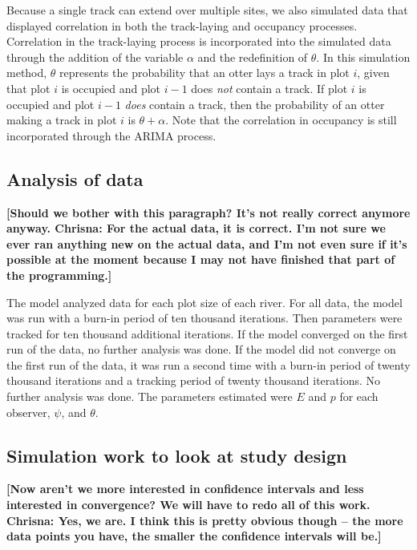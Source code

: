 \documentclass[11pt]{article}
\begin{document}
    Because a single track can extend over multiple sites, we also simulated
    data that displayed correlation in both the track-laying and occupancy
    processes.  Correlation in the track-laying process is incorporated into
    the simulated data through the addition of the variable \(\alpha\) and the
    redefinition of \(\theta\).  In this simulation method, \(\theta\)
    represents the probability that an otter lays a track in plot \(i\), given
    that plot \(i\) is occupied and plot \(i-1\) does \textit{not} contain a
    track. If plot \(i\) is occupied and plot \(i-1\) \textit{does} contain a
    track, then the probability of an otter making a track in plot \(i\) is
    \(\theta+\alpha\). Note that the correlation in occupancy is still
    incorporated through the ARIMA process.

    \subsection{Analysis of data}

    \textbf{[Should we bother with this paragraph? It's not really correct
    anymore anyway.  Chrisna: For the actual data, it is correct.  I'm not sure
    we ever ran anything new on the actual data, and I'm not even sure if it's
    possible at the moment because I may not have finished that part of the
    programming.]}

    The model analyzed data for each plot size of each river. For all data, the
    model was run with a burn-in period of ten thousand iterations.  Then
    parameters were tracked for ten thousand additional iterations.  If the
    model converged on the first run of the data, no further analysis was done.
    If the model did not converge on the first run of the data, it was run a
    second time with a burn-in period of twenty thousand iterations and a
    tracking period of twenty thousand iterations.  No further analysis was
    done.  The parameters estimated were \(E\) and \(p\) for each observer,
    \(\psi\), and \(\theta\).

    \subsection{Simulation work to look at study design}

    \textbf{[Now aren't we more interested in confidence intervals and less
    interested in convergence? We will have to redo all of this work.  Chrisna:
    Yes, we are.  I think this is pretty obvious though -- the more data points
    you have, the smaller the confidence intervals will be.]}
\end{document}
